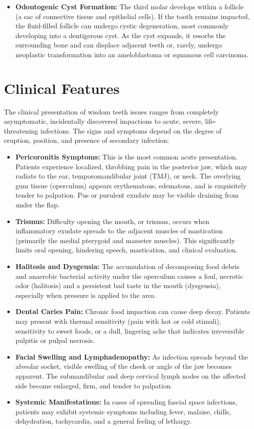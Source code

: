 \begin{itemize}
    \item \textbf{Odontogenic Cyst Formation:} The third molar develops within a follicle (a sac of connective tissue and epithelial cells). If the tooth remains impacted, the fluid-filled follicle can undergo cystic degeneration, most commonly developing into a dentigerous cyst. As the cyst expands, it resorbs the surrounding bone and can displace adjacent teeth or, rarely, undergo neoplastic transformation into an ameloblastoma or squamous cell carcinoma.
\end{itemize}

\section*{Clinical Features}
The clinical presentation of wisdom teeth issues ranges from completely asymptomatic, incidentally discovered impactions to acute, severe, life-threatening infections. The signs and symptoms depend on the degree of eruption, position, and presence of secondary infection:

\begin{itemize}
    \item \textbf{Pericoronitis Symptoms:} This is the most common acute presentation. Patients experience localized, throbbing pain in the posterior jaw, which may radiate to the ear, temporomandibular joint (TMJ), or neck. The overlying gum tissue (operculum) appears erythematous, edematous, and is exquisitely tender to palpation. Pus or purulent exudate may be visible draining from under the flap.
    \item \textbf{Trismus:} Difficulty opening the mouth, or trismus, occurs when inflammatory exudate spreads to the adjacent muscles of mastication (primarily the medial pterygoid and masseter muscles). This significantly limits oral opening, hindering speech, mastication, and clinical evaluation.
    \item \textbf{Halitosis and Dysgeusia:} The accumulation of decomposing food debris and anaerobic bacterial activity under the operculum causes a foul, necrotic odor (halitosis) and a persistent bad taste in the mouth (dysgeusia), especially when pressure is applied to the area.
    \item \textbf{Dental Caries Pain:} Chronic food impaction can cause deep decay. Patients may present with thermal sensitivity (pain with hot or cold stimuli), sensitivity to sweet foods, or a dull, lingering ache that indicates irreversible pulpitis or pulpal necrosis.
    \item \textbf{Facial Swelling and Lymphadenopathy:} As infection spreads beyond the alveolar socket, visible swelling of the cheek or angle of the jaw becomes apparent. The submandibular and deep cervical lymph nodes on the affected side become enlarged, firm, and tender to palpation.
    \item \textbf{Systemic Manifestations:} In cases of spreading fascial space infections, patients may exhibit systemic symptoms including fever, malaise, chills, dehydration, tachycardia, and a general feeling of lethargy.
\end{itemize}

